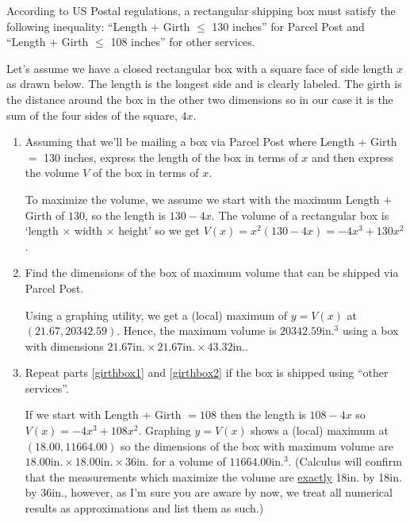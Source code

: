 \documentclass{ximera}
\begin{document}
\begin{problem}
According to US Postal regulations, a rectangular shipping box must satisfy the following inequality: ``Length + Girth $\leq$ 130 inches'' for Parcel Post and ``Length + Girth $\leq$ 108 inches'' for other services. 

Let's assume we have a closed rectangular box with a square face of side length $x$ as drawn below.  The length is the longest side and is clearly labeled.  The girth is the distance around the box in the other two dimensions so in our case it is the sum of the four sides of the square, $4x$. 

\begin{enumerate}

\item \label{girthbox1} Assuming that we'll be mailing a box via Parcel Post where Length + Girth $=$ 130 inches, express the length of the box in terms of $x$ and then express the volume $V$ of the box in terms of $x$.

\begin{solution}
    To maximize the volume, we assume we start with the maximum Length $+$ Girth of $130$,  so the length is $130 - 4x$.  The volume of a rectangular box is  `length $\times$ width $\times$ height' so we get $V(x) = x^{2}(130 - 4x) = -4x^{3} + 130x^{2}$.  
\end{solution}

\item \label{girthbox2} Find the dimensions of the box of maximum volume that can be shipped via Parcel Post.

\begin{solution}
    Using a graphing utility, we get a (local) maximum of  $y = V(x)$ at $(21.67, 20342.59)$.  Hence, the maximum volume is $20342.59\mbox{in.}^{3}$ using a box with dimensions $21.67\mbox{in.} \times 21.67\mbox{in.} \times 43.32\mbox{in.}$.
\end{solution}

\item Repeat parts \ref{girthbox1} and \ref{girthbox2} if the box is shipped using ``other services''.

\begin{solution}
    If we start with Length $+$ Girth $= 108$ then the length is $108 - 4x$ so  $V(x) = -4x^{3} + 108x^{2}$.  Graphing $y = V(x)$  shows a (local) maximum at $(18.00, 11664.00)$ so the dimensions of the box with maximum volume are $18.00\mbox{in.} \times 18.00\mbox{in.} \times 36\mbox{in.}$ for a volume of $11664.00\mbox{in.}^{3}$.  (Calculus will confirm that the measurements which maximize the volume are \underline{exactly} 18in. by 18in. by 36in., however, as I'm sure you are aware by now, we treat all numerical results as approximations and list them as such.)
\end{solution}


\end{enumerate}
\end{problem}
\end{document}
